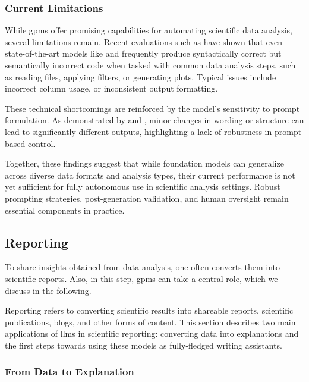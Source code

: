 \subsubsection{Current Limitations}
While \glspl{gpm} offer promising capabilities for automating scientific data analysis, several limitations remain. 
Recent evaluations such as  \autocite{tian2024scicode} have shown that even state-of-the-art models like  and  frequently produce syntactically correct but semantically incorrect code when tasked with common data analysis steps, such as reading files, applying filters, or generating plots. 
Typical issues include incorrect column usage, or inconsistent output formatting.

These technical shortcomings are reinforced by the model's sensitivity to prompt formulation. As demonstrated by \textcite{Yan2020auto} and \textcite{alampara2024probing}, minor changes in wording or structure can lead to significantly different outputs, highlighting a lack of robustness in prompt-based control. 

Together, these findings suggest that while foundation models can generalize across diverse data formats and analysis types, their current performance is not yet sufficient for fully autonomous use in scientific analysis settings. 
Robust prompting strategies, post-generation validation, and human oversight remain essential components in practice.



\subsection{Reporting}
To share insights obtained from data analysis, one often converts them into scientific reports. 
Also, in this step, \glspl{gpm} can take a central role, which we discuss in the following.

Reporting refers to converting scientific results into shareable reports, scientific publications, blogs, and other forms of content. 
This section describes two main applications of \glspl{llm} in scientific reporting: converting data into explanations and the first steps towards using these models as fully-fledged writing assistants.

\subsubsection{From Data to Explanation}

